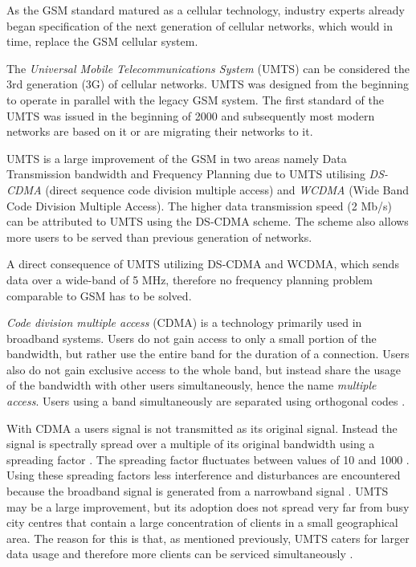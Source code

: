 As the GSM standard matured as a cellular technology, industry experts already began specification of the next generation of cellular networks, which would in time, replace the GSM cellular system. 

The \emph{Universal Mobile Telecommunications System} (UMTS) can be considered the 3rd generation (3G) of cellular networks. UMTS was designed from the beginning to operate in parallel with the legacy GSM system. The first standard of the UMTS was issued in the beginning of 2000 and subsequently most modern networks are based on it or are migrating their networks to it.

UMTS is a large improvement of the GSM in two areas namely Data Transmission bandwidth and Frequency Planning due to UMTS utilising \emph{DS-CDMA} (direct sequence code division multiple access) and \emph{WCDMA} (Wide Band Code Division Multiple Access). The higher data transmission speed (2 Mb/s) can be attributed to UMTS using the DS-CDMA scheme. The scheme also allows more users to be served than previous generation of networks\cite{tabuglobalplanning3g,Eisenblatter}. 

A direct consequence of UMTS utilizing DS-CDMA and WCDMA, which sends data over a wide-band of 5 MHz, therefore no frequency planning problem comparable to GSM has to be solved\cite{tabuglobalplanning3g,Eisenblatter}. 

\emph{Code division multiple access} (CDMA) is a technology primarily used in broadband systems. Users do not gain access to only a small portion of the bandwidth, but rather use the entire band for the duration of a connection. Users also do not gain exclusive access to the whole band, but instead share the usage of the bandwidth with other users simultaneously, hence the name \emph{multiple access}. Users using a band simultaneously are separated using orthogonal codes \cite{GSMArchitectureProtocolsServices}.

With CDMA a users signal is not transmitted as its original signal. Instead the signal is spectrally spread over a multiple of its original bandwidth using a spreading factor \cite{GSMArchitectureProtocolsServices}. The spreading factor fluctuates between values of 10 and 1000 \cite{GSMArchitectureProtocolsServices}. Using these spreading factors less interference and disturbances are encountered because the broadband signal is generated from a narrowband signal \cite{GSMArchitectureProtocolsServices}.
UMTS may be a large improvement, but its adoption does not spread very far from busy city centres that contain a large concentration of clients in a small geographical area. The reason for this is that, as mentioned previously, UMTS caters for larger data usage and therefore more clients can be serviced simultaneously \cite{GSMArchitectureProtocolsServices}.

